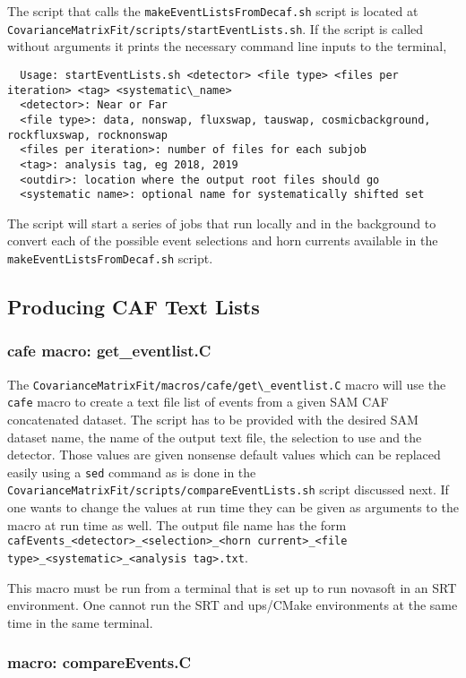 The script that calls the \lstinline{makeEventListsFromDecaf.sh} script is located at \lstinline{CovarianceMatrixFit/scripts/startEventLists.sh}.  If the script is called without arguments it prints the necessary command line inputs to the terminal,
\begin{lstlisting}
  Usage: startEventLists.sh <detector> <file type> <files per iteration> <tag> <systematic\_name>
  <detector>: Near or Far
  <file type>: data, nonswap, fluxswap, tauswap, cosmicbackground, rockfluxswap, rocknonswap
  <files per iteration>: number of files for each subjob
  <tag>: analysis tag, eg 2018, 2019
  <outdir>: location where the output root files should go
  <systematic name>: optional name for systematically shifted set
\end{lstlisting}
The script will start a series of jobs that run locally and in the background to convert each of the possible event selections and horn currents available in the \lstinline{makeEventListsFromDecaf.sh} script.

\subsection{Producing CAF Text Lists}

\subsubsection{cafe macro: get\_eventlist.C}

The \lstinline{CovarianceMatrixFit/macros/cafe/get\_eventlist.C} macro will use the \lstinline{cafe} macro to create a text file list of events from a given SAM CAF concatenated dataset.  The script has to be provided with the desired SAM dataset name, the name of the output text file, the selection to use and the detector. Those values are given nonsense default values which can be replaced easily using a \lstinline{sed} command as is done in the \lstinline{CovarianceMatrixFit/scripts/compareEventLists.sh} script discussed next.  If one wants to change the values at run time they can be given as arguments to the macro at run time as well. The output file name has the form \lstinline{cafEvents_<detector>_<selection>_<horn current>_<file type>_<systematic>_<analysis tag>.txt}.

This macro must be run from a terminal that is set up to run novasoft in an SRT environment.  One cannot run the SRT and ups/CMake environments at the same time in the same terminal.

\subsubsection{macro: compareEvents.C}


